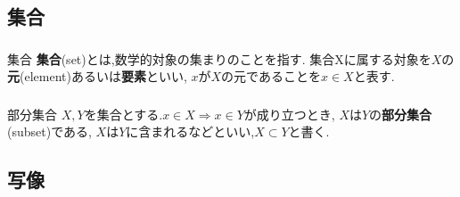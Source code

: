 \documentclass[dvipdfmx,b4j]{jsarticle}
\begin{document}
\tableofcontents

\section{}
\subsection{集合}

\subsubsection{}
\begin{definition}{集合}{}
\textbf{集合}(set)とは,数学的対象の集まりのことを指す.
集合Xに属する対象を$X$の\textbf{元}(element)あるいは\textbf{要素}といい,
$x$が$X$の元であることを$x\in X$と表す.
\end{definition}
%
%
\subsubsection{}
\begin{definition}{部分集合}{}
$X,Y$を集合とする.$x\in X\Longrightarrow x\in Y$が成り立つとき,
$X$は$Y$の\textbf{部分集合}(subset)である,
$X$は$Y$に含まれるなどといい,$X\subset Y$と書く.
\end{definition}

\subsection{写像}
\end{document}
